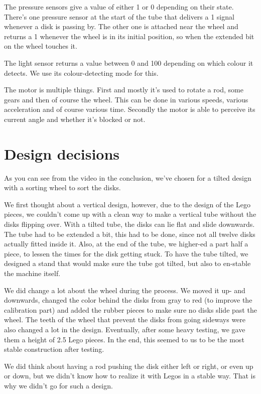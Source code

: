 The pressure sensors give a value of either 1 or 0 depending on their state. There's one pressure sensor at the start of the tube that delivers a 1 signal whenever a disk is passing by. The other one is attached near the wheel and returns a 1 whenever the wheel is in its initial position, so when the extended bit on the wheel touches it.

The light sensor returns a value between 0 and 100 depending on which colour it detects. We use its colour-detecting mode for this.

The motor is multiple things. First and mostly it's used to rotate a rod, some gears and then of course the wheel. This can be done in various speeds, various acceleration and of course various time. Secondly the motor is able to perceive its current angle and whether it's blocked or not.

\section{Design decisions} \label{machine-design:design-decisions}
As you can see from the video in the conclusion, we've chosen for a tilted design with a sorting wheel to sort the disks. 

We first thought about a vertical design, however, due to the design of the Lego pieces, we couldn't come up with a clean way to make a vertical tube without the disks flipping over. With a tilted tube, the disks can lie flat and slide downwards. The tube had to be extended a bit, this had to be done, since not all twelve disks actually fitted inside it. Also, at the end of the tube, we higher-ed a part half a piece, to lessen the times for the disk getting stuck. To have the tube tilted, we designed a stand that would make sure the tube got tilted, but also to en-stable the machine itself.

We did change a lot about the wheel during the process. We moved it up- and downwards, changed the color behind the disks from gray to red (to improve the calibration part) and added the rubber pieces to make sure no disks slide past the wheel. The teeth of the wheel that prevent the disks from going sideways were also changed a lot in the design. Eventually, after some heavy testing, we gave them a height of 2.5 Lego pieces. In the end, this seemed to us to be the most stable construction after testing. 

We did think about having a rod pushing the disk either left or right, or even up or down, but we didn't know how to realize it with Legos in a stable way. That is why we didn't go for such a design.

